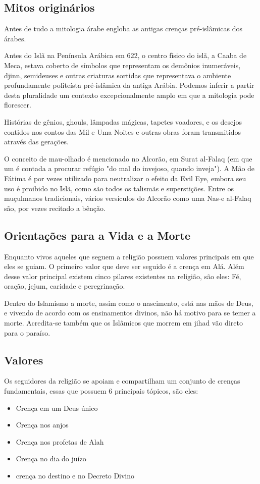 \documentclass[12pt]{article}
\begin{document}
\subsection{Mitos originários}
Antes de tudo a mitologia árabe engloba as antigas crenças pré-islâmicas dos árabes. 
\par Antes do Islã na Península Arábica em 622, o centro físico do islã, a Caaba de Meca, estava coberto de símbolos que representam os demônios inumeráveis, djinn, semideuses e outras criaturas sortidas que representava o ambiente profundamente politeísta pré-islâmica da antiga Arábia. Podemos inferir a partir desta pluralidade um contexto excepcionalmente amplo em que a mitologia pode florescer.
\par Histórias de gênios, ghouls, lâmpadas mágicas, tapetes voadores, e os desejos contidos nos contos das Mil e Uma Noites e outras obras foram transmitidos através das gerações.
\par O conceito de mau-olhado é mencionado no Alcorão, em Surat al-Falaq (em que um é contada a procurar refúgio "do mal do invejoso, quando inveja"). A Mão de Fátima é por vezes utilizado para neutralizar o efeito da Evil Eye, embora seu uso é proibido no Islã, como são todos os talismãs e superstições. Entre os muçulmanos tradicionais, vários versículos do Alcorão como uma Nas-e al-Falaq são, por vezes recitado a bênção.

\subsection{Orientações para a Vida e a Morte}
Enquanto vivos aqueles que seguem a religião possuem valores principais em que eles se guiam. O primeiro valor que deve ser seguido é a crença em Alá. Além desse valor principal existem cinco pilares existentes na religião, são eles: Fé, oração, jejum, caridade e peregrinação.
\par Dentro do Islamismo a morte, assim como o nascimento, está nas mãos de Deus, e vivendo de acordo com os ensinamentos divinos, não há motivo para se temer a morte. Acredita-se também que os Islâmicos que morrem em jihad vão direto para o paraíso.
\subsection{Valores}
Os seguidores da religião se apoiam e compartilham um conjunto de crenças fundamentais, essas que possuem 6 principais tópicos, são eles:
\begin{itemize}
    \item Crença em um Deus único
    \item Crença nos anjos
    \item Crença nos profetas de Alah
    \item Crença no dia do juízo
    \item crença no destino e no Decreto Divino
\end{itemize}
\end{document}
